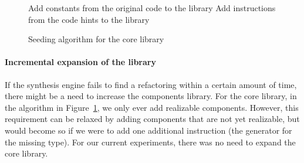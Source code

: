 \documentclass[sigconf,review,anonymous]{acmart}
\makeatletter
\newcommand{\removelatexerror}{\let\@latex@error\@gobble}
\makeatother
\begin{document}


\begin{figure}
\removelatexerror%
\begin{algorithm}[H]
\SetAlgoLined
{}
 Add constants from the original code to the library\;
 Add instructions from the code hints to the library\;
\end{algorithm}
 \caption{Seeding algorithm for the core library}
\label{alg:seeding-core}
\end{figure}


\paragraph{Incremental expansion of the library}
If the synthesis engine fails to find a refactoring within a certain amount of time,
there might be a need to increase the components library.
For the core library, in the algorithm in Figure~\ref{alg:seeding-core}, we only ever add realizable components. However, this requirement can be relaxed by adding components that
are not yet realizable, but would become so if we were to add one
additional instruction (the generator for the missing type). For our current experiments,
there was no need to expand the core library. 

\end{document}
